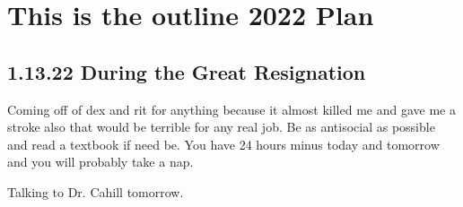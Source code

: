 \chapter{This is the outline 2022 Plan}
\section{1.13.22 During the Great Resignation}
Coming off of dex and rit for anything because it almost killed me and gave me a stroke also that would be terrible for any real job. 
Be as antisocial as possible and read a textbook if need be. You have 24 hours minus today and tomorrow and you will probably take a nap. 


Talking to Dr. Cahill tomorrow. 